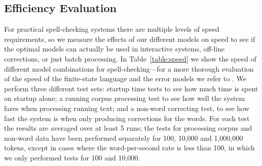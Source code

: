 \documentclass[a4paper,12pt]{article}
\begin{document}
%


\subsection{Efficiency Evaluation}
\label{subsec:efficiency}

For practical spell-checking systems there are multiple levels of speed
requirements, so we measure the effects of our different models on speed to see
if the optimal models can actually be used in interactive systems, off-line
corrections, or just batch processing. In Table~\ref{table:speed} we show the
speed of different model combinations for spell-checking---for a more thorough
evaluation of the speed of the finite-state language and the error models we
refer to \cite{pirinen2012improving}. We perform three different test sets:
startup time tests to see how much time is spent on startup alone; a running
corpus processing test to see how well the system fares when processing running
text; and a non-word correcting test, to see how fast the system is when only
producing corrections for the words. For each test the results are averaged
over at least 5 runs; the tests for processing corpus and non-word data have
been performed separately for 100, 10,000 and 1,000,000 tokens, except in cases
where the word-per-second rate is less than 100, in which we only performed tests for 100
and 10,000.
\end{document}
